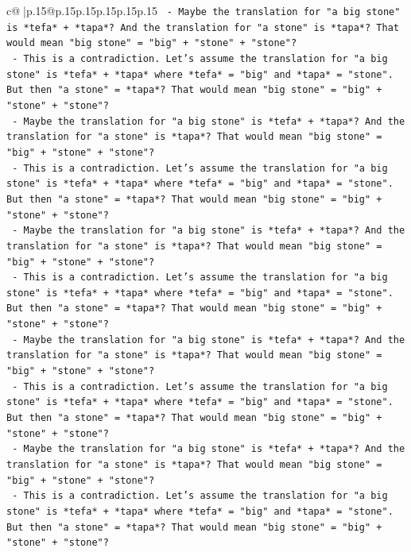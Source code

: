 \documentclass{article}
\begin{document}
{\begin{supertabular}{c@{$\;$}|p{.15\linewidth}@{}p{.15\linewidth}p{.15\linewidth}p{.15\linewidth}p{.15\linewidth}p{.15\linewidth}}
{{{\texttt{                {-} Maybe the translation for "a big stone" is *tefa* + *tapa*? And the translation for "a stone" is *tapa*? That would mean "big stone" = "big" + "stone" + "stone"?} \\
\texttt{                {-} This is a contradiction. Let's assume the translation for "a big stone" is *tefa* + *tapa* where *tefa* = "big" and *tapa* = "stone". But then "a stone" = *tapa*? That would mean "big stone" = "big" + "stone" + "stone"?} \\
\texttt{                {-} Maybe the translation for "a big stone" is *tefa* + *tapa*? And the translation for "a stone" is *tapa*? That would mean "big stone" = "big" + "stone" + "stone"?} \\
\texttt{                {-} This is a contradiction. Let's assume the translation for "a big stone" is *tefa* + *tapa* where *tefa* = "big" and *tapa* = "stone". But then "a stone" = *tapa*? That would mean "big stone" = "big" + "stone" + "stone"?} \\
\texttt{                {-} Maybe the translation for "a big stone" is *tefa* + *tapa*? And the translation for "a stone" is *tapa*? That would mean "big stone" = "big" + "stone" + "stone"?} \\
\texttt{                {-} This is a contradiction. Let's assume the translation for "a big stone" is *tefa* + *tapa* where *tefa* = "big" and *tapa* = "stone". But then "a stone" = *tapa*? That would mean "big stone" = "big" + "stone" + "stone"?} \\
\texttt{                {-} Maybe the translation for "a big stone" is *tefa* + *tapa*? And the translation for "a stone" is *tapa*? That would mean "big stone" = "big" + "stone" + "stone"?} \\
\texttt{                {-} This is a contradiction. Let's assume the translation for "a big stone" is *tefa* + *tapa* where *tefa* = "big" and *tapa* = "stone". But then "a stone" = *tapa*? That would mean "big stone" = "big" + "stone" + "stone"?} \\
\texttt{                {-} Maybe the translation for "a big stone" is *tefa* + *tapa*? And the translation for "a stone" is *tapa*? That would mean "big stone" = "big" + "stone" + "stone"?} \\
\texttt{                {-} This is a contradiction. Let's assume the translation for "a big stone" is *tefa* + *tapa* where *tefa* = "big" and *tapa* = "stone". But then "a stone" = *tapa*? That would mean "big stone" = "big" + "stone" + "stone"?} \\
}}}
\end{supertabular}}
\end{document}
